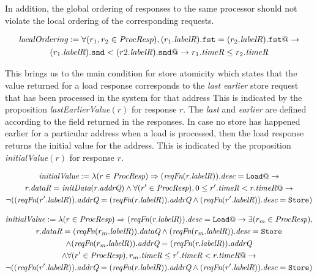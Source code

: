 In addition, the global ordering of responses to the same processor should not
violate the local ordering of the corresponding requests.

\begin{defn}
\small
\begin{multline*}
\textit{localOrdering} :=
\forall (r_1, r_2 \in \textit{ProcResp}), (r_1.\textit{labelR}).\texttt{fst} = (r_2.\textit{labelR}).\texttt{fst} @->\\
(r_1.\textit{labelR}).\texttt{snd} < (r2.\textit{labelR}).\texttt{snd} @-> r_1.\textit{timeR} \le r_2.\textit{timeR}
\end{multline*}
\end{defn}

This brings us to the main condition for store atomicity which states that the
value returned for a load response corresponds to the \emph{last earlier} store
request that has been processed in the system for that address This is
indicated by the proposition \textit{lastEarlierValue}$(r)$ for response $r$.
The \emph{last} and \emph{earlier} are defined according to the field \timeR{}
returned in the responses. In case no store has happened earlier for a
particular address when a load is processed, then the load response returns the
initial value for the address. This is indicated by the proposition
\textit{initialValue}$(r)$ for response $r$.
\begin{defn}
\small
\begin{multline*}
\textit{initialValue} := \lambda (r \in \textit{ProcResp}) \Rightarrow
(\textit{reqFn} (r.\textit{labelR})).\textit{desc} = \texttt{Load} @->\\ r.\textit{dataR} = \textit{initData} (r.\textit{addrQ}) \wedge 
\forall (r' \in \textit{ProcResp}), 0 \le r'.\textit{timeR} < r.\textit{timeR} @->\\
\neg ((\textit{reqFn} (r'.\textit{labelR})).\textit{addrQ} = (\textit{reqFn} (r.\textit{labelR})).\textit{addrQ} \wedge (\textit{reqFn} (r'.\textit{labelR})).\textit{desc} = \texttt{Store})
\end{multline*}
\end{defn}

\begin{defn}
\small
\begin{multline*}
\textit{initialValue} := \lambda (r \in \textit{ProcResp}) \Rightarrow
(\textit{reqFn} (r.\textit{labelR})).\textit{desc} = \texttt{Load} @->
\exists (r_m \in \textit{ProcResp}),\\ r.\textit{dataR} = (\textit{reqFn} (r_m.\textit{labelR})).\textit{dataQ} \wedge 
(\textit{reqFn} (r_m.\textit{labelR})).\textit{desc} = \texttt{Store} \\ \wedge (\textit{reqFn} (r_m.\textit{labelR})).\textit{addrQ} = (\textit{reqFn} (r.\textit{labelR})).\textit{addrQ}\\ \wedge
\forall (r' \in \textit{ProcResp}), r_m.\textit{timeR} \le r'.\textit{timeR} < r.\textit{timeR} @->\\
\neg ((\textit{reqFn} (r'.\textit{labelR})).\textit{addrQ} = (\textit{reqFn} (r.\textit{labelR})).\textit{addrQ} \wedge (\textit{reqFn} (r'.\textit{labelR})).\textit{desc} = \texttt{Store})
\end{multline*}
\end{defn}


